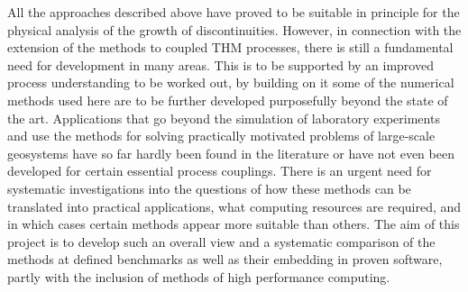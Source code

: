 All the approaches described above have proved to be suitable in principle for the physical analysis of the growth of discontinuities. However, in connection with the extension of the methods to coupled THM processes, there is still a fundamental need for development in many areas. This is to be supported by an improved process understanding to be worked out, by building on it some of the numerical methods used here are to be further developed purposefully beyond the state of the art. Applications that go beyond the simulation of laboratory experiments and use the methods for solving practically motivated problems of large-scale geosystems have so far hardly been found in the literature or have not even been developed for certain essential process couplings. There is an urgent need for systematic investigations into the questions of how these methods can be translated into practical applications, what computing resources are required, and in which cases certain methods appear more suitable than others. The aim of this project is to develop such an overall view and a systematic comparison of the methods at defined benchmarks as well as their embedding in proven software, partly with the inclusion of methods of high performance computing.